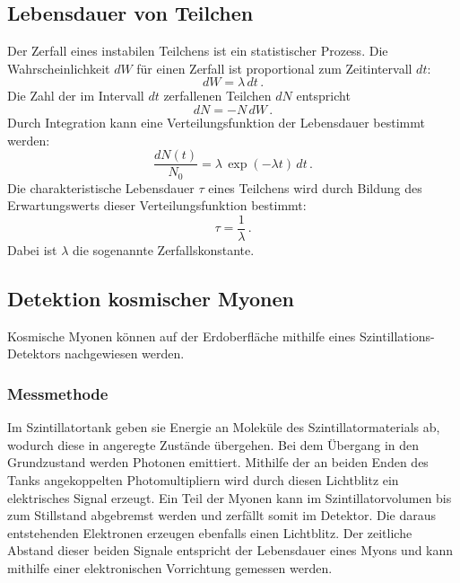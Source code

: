\subsection{Lebensdauer von Teilchen}
Der Zerfall eines instabilen Teilchens ist ein statistischer Prozess. Die Wahrscheinlichkeit $dW$ für einen Zerfall ist proportional zum Zeitintervall $dt$:
\begin{equation*}
    dW = \lambda \, dt \, .
\end{equation*}
Die Zahl der im Intervall $dt$ zerfallenen Teilchen $dN$ entspricht
\begin{equation*}
    dN = - N \, dW \, .
\end{equation*}
Durch Integration kann eine Verteilungsfunktion der Lebensdauer bestimmt werden:
\begin{equation}
    \frac{dN(t)}{N_0} = \lambda \, \exp(- \lambda t) \, dt \, .
    \label{eq:verteilung}
\end{equation}
Die charakteristische Lebensdauer $\tau$ eines Teilchens wird durch Bildung des Erwartungswerts dieser Verteilungsfunktion bestimmt:
\begin{equation}
    \tau = \frac{1}{\lambda} \, .
    \label{eq:tau}
\end{equation}
Dabei ist $\lambda$ die sogenannte Zerfallskonstante.


\subsection{Detektion kosmischer Myonen}

Kosmische Myonen können auf der Erdoberfläche mithilfe eines Szintillations-Detektors nachgewiesen werden. 



\subsubsection{Messmethode}
Im Szintillatortank geben sie Energie an Moleküle des Szintillatormaterials ab, wodurch diese in angeregte Zustände übergehen. Bei dem Übergang in den Grundzustand werden Photonen emittiert. Mithilfe der an beiden Enden des Tanks angekoppelten Photomultipliern wird durch diesen Lichtblitz  ein elektrisches Signal erzeugt. Ein Teil der Myonen kann im Szintillatorvolumen bis zum Stillstand abgebremst werden und zerfällt somit im Detektor. Die daraus entstehenden Elektronen erzeugen ebenfalls einen Lichtblitz. Der zeitliche Abstand dieser beiden Signale entspricht der Lebensdauer eines Myons und kann mithilfe einer elektronischen Vorrichtung gemessen werden.


